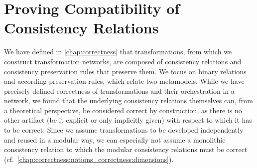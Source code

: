 \chapter{Proving Compatibility of Consistency Relations
}
\label{chap:compatibility}


We have defined in \autoref{chap:correctness} that transformations, from which we construct transformation networks, are composed of consistency relations and consistency preservation rules that preserve them.
We focus on binary relations and according preservation rules, which relate two metamodels.
While we have precisely defined correctness of transformations and their orchestration in a network, we
found that the underlying consistency relations themselves can, from a theoretical perspective, be considered correct by construction, as there is no other artifact (be it explicit or only implicitly given) with respect to which it has to be correct.
Since we assume transformations to be developed independently and reused in a modular way, we can especially not assume a monolithic consistency relation to which the modular consistency relations must be correct (cf.\ \autoref{chap:correctness:notions_correctness:dimensions}).

